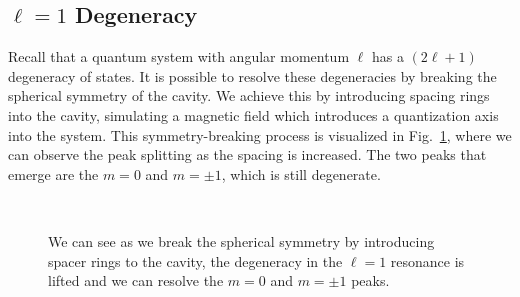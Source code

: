 \documentclass[12pt]{article}
\newcommand{\figref}[1]{Fig.\ \ref{#1}}
\begin{document}
	\subsection{$\ell=1$ Degeneracy}
	Recall that a quantum system with angular momentum $\ell$ has a $(2\ell+1)$ degeneracy of states. It is possible to resolve these degeneracies by breaking the spherical symmetry of the cavity. We achieve this by introducing spacing rings into the cavity, simulating a magnetic field which introduces a quantization axis into the system. This symmetry-breaking process is visualized in \figref{degenResolution}, where we can observe the peak splitting as the spacing is increased. The two peaks that emerge are the $m=0$ and $m=\pm1$, which is still degenerate.
	
	\begin{figure}[H]
		\centering
		\qquad
		\\
		\qquad
		\caption{We can see as we break the spherical symmetry by introducing spacer rings to the cavity, the degeneracy in the $\ell=1$ resonance is lifted and we can resolve the $m = 0$ and $m = \pm1$ peaks.}
		\label{degenResolution}
	\end{figure}
\end{document}
